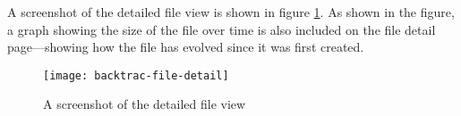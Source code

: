 A screenshot of the detailed file view is shown in figure
\ref{fig:backtrac-file-detail}. As shown in the figure, a graph showing the
size of the file over time is also included on the file detail page---showing
how the file has evolved since it was first created.

\begin{figure}[h]
    \begin{center}
        \texttt{[image: backtrac-file-detail]}
    \end{center}
    \caption{A screenshot of the detailed file view}
    \label{fig:backtrac-file-detail}
\end{figure}
